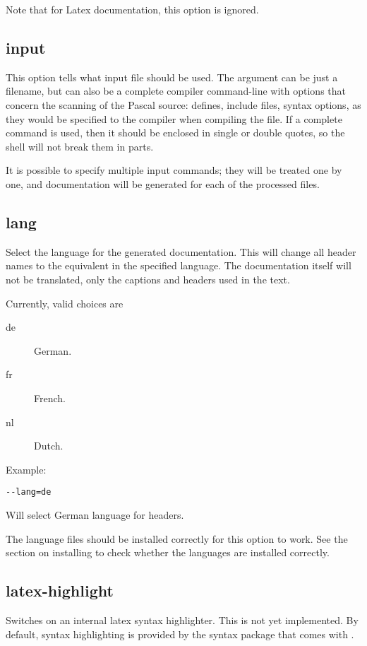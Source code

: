 Note that for Latex documentation, this option is ignored.

\subsection{input}
\label{suse:input}
This option tells \fpdoc what input file should be used. The argument can 
be just a filename, but can also be a complete compiler command-line with 
options that concern the scanning of the Pascal source: defines, include 
files, syntax options,  as they would be specified to the \fpc compiler 
when compiling the file. If a complete command is used, then it should be 
enclosed in single or double quotes, so the shell will not break them in 
parts.

It is possible to specify multiple input commands; they will be treated one
by one, and documentation will be generated for each of the processed files.

\subsection{lang}
\label{suse:lang}
Select the language for the generated documentation. This will change all
header names to the equivalent in the specified language. The documentation
itself will not be translated, only the captions and headers used in the
text.

Currently, valid choices are
\begin{description}
\item[de] German.
\item[fr] French.
\item[nl] Dutch.
\end{description}

Example:
\begin{verbatim}
--lang=de
\end{verbatim}
Will select German language for headers.

The language files should be installed correctly for this option to work.
See the section on installing to check whether the languages are installed
correctly.

\subsection{latex-highlight}
\label{suse:latexhighlight}
Switches on an internal latex syntax highlighter. This is not yet
implemented. By default, syntax highlighting is provided by the syntax
package that comes with \fpc.

